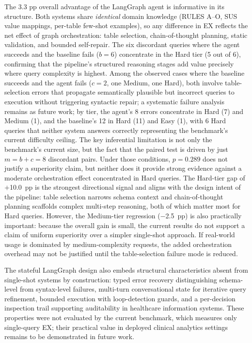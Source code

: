 \documentclass[conference]{IEEEtran}
\begin{document}
The 3.3 pp overall advantage of the LangGraph agent is informative in its structure. Both systems share \emph{identical} domain knowledge (RULES A--O, SUS value mappings, per-table few-shot examples), so any difference in EX reflects the net effect of graph orchestration: table selection, chain-of-thought planning, static validation, and bounded self-repair. The six discordant queries where the agent succeeds and the baseline fails ($b{=}6$) concentrate in the Hard tier (5 out of 6), confirming that the pipeline's structured reasoning stages add value precisely where query complexity is highest. Among the observed cases where the baseline succeeds and the agent fails ($c{=}2$, one Medium, one Hard), both involve table-selection errors that propagate semantically plausible but incorrect queries to execution without triggering syntactic repair; a systematic failure analysis remains as future work; by tier, the agent's 8 errors concentrate in Hard (7) and Medium (1), and the baseline's 12 in Hard (11) and Easy (1), with 6 Hard queries that neither system answers correctly representing the benchmark's current difficulty ceiling. The key inferential limitation is not only the benchmark's current size, but the fact that the paired test is driven by just $m{=}b{+}c{=}8$ discordant pairs. Under those conditions, $p{=}0.289$ does not justify a superiority claim, but neither does it provide strong evidence against a moderate orchestration effect concentrated in Hard queries. The Hard-tier gap of $+$10.0~pp is the strongest directional signal and aligns with the design intent of the pipeline: table selection narrows schema context and chain-of-thought planning scaffolds complex multi-step reasoning, both of which matter most for Hard queries. However, the Medium-tier regression ($-$2.5~pp) is also practically important: because the overall gain is small, the current results do not support a claim of uniform superiority over a simpler single-shot approach. If real-world usage is dominated by medium-complexity requests, the added orchestration overhead may not be justified until the table-selection failure mode is reduced.

The stateful LangGraph design also embeds structural characteristics absent from single-shot systems by construction: typed error recovery distinguishing schema-level from syntax-level failures, multi-turn conversational state for iterative query refinement, bounded execution with loop-detection guards, and a per-decision inspection trail supporting auditability in healthcare information systems. These properties were not evaluated by the current benchmark, which measures only single-query EX; their practical value in deployed clinical analytics settings remains to be demonstrated in future work.
\end{document}
